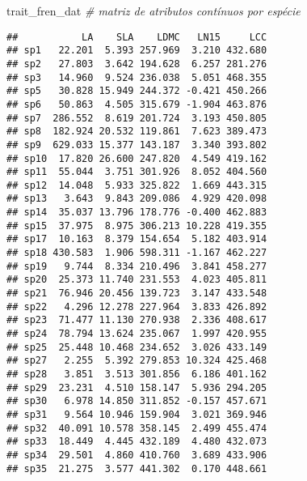 \documentclass[
]{book}
\newenvironment{Shaded}{\begin{snugshade}}{\end{snugshade}}
\newcommand{\CommentTok}[1]{\textcolor[rgb]{0.56,0.35,0.01}{\textit{#1}}}
\newcommand{\NormalTok}[1]{#1}
\begin{document}
\begin{Shaded}
\begin{Highlighting}[]
\NormalTok{trait_fren_dat }\CommentTok{# matriz de atributos contínuos por espécie}
\end{Highlighting}
\end{Shaded}

\begin{verbatim}
##           LA    SLA    LDMC   LN15     LCC
## sp1   22.201  5.393 257.969  3.210 432.680
## sp2   27.803  3.642 194.628  6.257 281.276
## sp3   14.960  9.524 236.038  5.051 468.355
## sp5   30.828 15.949 244.372 -0.421 450.266
## sp6   50.863  4.505 315.679 -1.904 463.876
## sp7  286.552  8.619 201.724  3.193 450.805
## sp8  182.924 20.532 119.861  7.623 389.473
## sp9  629.033 15.377 143.187  3.340 393.802
## sp10  17.820 26.600 247.820  4.549 419.162
## sp11  55.044  3.751 301.926  8.052 404.560
## sp12  14.048  5.933 325.822  1.669 443.315
## sp13   3.643  9.843 209.086  4.929 420.098
## sp14  35.037 13.796 178.776 -0.400 462.883
## sp15  37.975  8.975 306.213 10.228 419.355
## sp17  10.163  8.379 154.654  5.182 403.914
## sp18 430.583  1.906 598.311 -1.167 462.227
## sp19   9.744  8.334 210.496  3.841 458.277
## sp20  25.373 11.740 231.553  4.023 405.811
## sp21  76.946 20.456 139.723  3.147 433.548
## sp22   4.296 12.278 227.964  3.833 426.892
## sp23  71.477 11.130 270.938  2.336 408.617
## sp24  78.794 13.624 235.067  1.997 420.955
## sp25  25.448 10.468 234.652  3.026 433.149
## sp27   2.255  5.392 279.853 10.324 425.468
## sp28   3.851  3.513 301.856  6.186 401.162
## sp29  23.231  4.510 158.147  5.936 294.205
## sp30   6.978 14.850 311.852 -0.157 457.671
## sp31   9.564 10.946 159.904  3.021 369.946
## sp32  40.091 10.578 358.145  2.499 455.474
## sp33  18.449  4.445 432.189  4.480 432.073
## sp34  29.501  4.860 410.760  3.689 433.906
## sp35  21.275  3.577 441.302  0.170 448.661
\end{verbatim}
\end{document}
